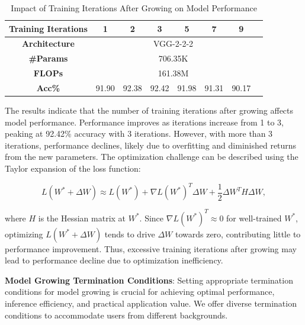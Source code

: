 \documentclass[preprint,12pt]{elsarticle}
\begin{document}
\begin{table}[ht]
\centering
\tiny
\renewcommand{\arraystretch}{1.3}
\begin{adjustbox}{center}
\begin{tabular}{c|ccccccc}
\hline
\textbf{Training Iterations} & \textbf{1} & \textbf{2} & \textbf{3} & \textbf{5} & \textbf{7} & \textbf{9} \\
\hline
\textbf{Architecture} & \multicolumn{6}{c}{VGG-2-2-2} \\
\hline
\textbf{\#Params} & \multicolumn{6}{c}{706.35K} \\
\hline
\textbf{FLOPs} & \multicolumn{6}{c}{161.38M} \\
\hline
\textbf{Acc\%} & 91.90 & 92.38 & 92.42 & 91.98 & 91.31 & 90.17 \\
\hline
\end{tabular}
\end{adjustbox}
\caption{Impact of Training Iterations After Growing on Model Performance}
\label{table:training_iterations}
\end{table}

The results indicate that the number of training iterations after growing affects model performance. Performance improves as iterations increase from 1 to 3, peaking at 92.42\% accuracy with 3 iterations. However, with more than 3 iterations, performance declines, likely due to overfitting and diminished returns from the new parameters. The optimization challenge can be described using the Taylor expansion of the loss function:

\begin{equation}
L(W^\ast + \Delta W) \approx L(W^\ast) + \nabla L(W^\ast)^T \Delta W + \frac{1}{2} \Delta W^T H \Delta W,
\end{equation}

where \( H \) is the Hessian matrix at \( W^\ast \). Since \( \nabla L(W^\ast)^T \approx 0 \) for well-trained \( W^\ast \), optimizing \( L(W^\ast + \Delta W) \) tends to drive \( \Delta W \) towards zero, contributing little to performance improvement. Thus, excessive training iterations after growing may lead to performance decline due to optimization inefficiency.

\textbf{Model Growing Termination Conditions}: Setting appropriate termination conditions for model growing is crucial for achieving optimal performance, inference efficiency, and practical application value. We offer diverse termination conditions to accommodate users from different backgrounds.
\end{document}
